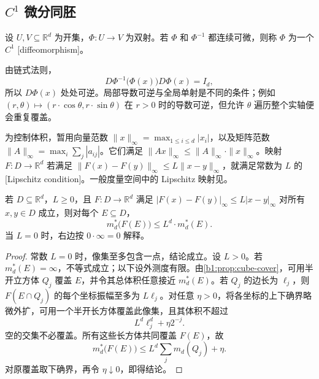 \subsection{\texorpdfstring{\(C^1\)}{C1} 微分同胚}
\label{b1:subsec:070502}

\begin{definition}\label{b1:def:c1-diffeomorphism}
设 \(U,V\subseteq\mathbb R^d\) 为开集，\(\Phi:U\rightarrow V\) 为双射。若 \(\Phi\) 和 \(\Phi^{-1}\) 都连续可微，则称 \(\Phi\) 为一个 \(C^1\) [diffeomorphism]。
\end{definition}

由链式法则，
\[
D\Phi^{-1}\bigl(\Phi(x)\bigr)D\Phi(x)=I_d,
\]
所以 \(D\Phi(x)\) 处处可逆。局部导数可逆与全局单射是不同的条件；例如 \((r,\theta)\mapsto(r\cdot \cos\theta,r\cdot \sin\theta)\) 在 \(r>0\) 时的导数可逆，但允许 \(\theta\) 遍历整个实轴便会重复覆盖。

\ProseParagraphBreak

为控制体积，暂用向量范数
\(\|x\|_\infty=\max_{1\leq i\leq d}|x_i|\)，以及矩阵范数
\(\|A\|_\infty=\max_i\sum_j|a_{ij}|\)。它们满足
\(\|Ax\|_\infty\leq\|A\|_\infty\cdot\|x\|_\infty\)。映射 \(F:D\rightarrow\mathbb R^d\) 若满足
\(\|F(x)-F(y)\|_\infty\leq L\|x-y\|_\infty\)，就满足常数为 \(L\) 的[Lipschitz condition]。一般度量空间中的 Lipschitz 映射见。

\begin{lemma}\label{b1:lem:cube-lipschitz-distortion}
若 \(D\subseteq\mathbb R^d\)，\(L\ge0\)，且 \(F:D\rightarrow\mathbb R^d\) 满足 \(|F(x)-F(y)|_\infty\le L|x-y|_\infty\) 对所有 \(x,y\in D\) 成立，则对每个 \(E\subseteq D\)，
\[
m_d^*\bigl(F(E)\bigr)\leq L^d \cdot m_d^*(E).
\]
当 \(L=0\) 时，右边按 \(0\cdot\infty=0\) 解释。
\end{lemma}
\begin{proof}
常数 \(L=0\) 时，像集至多包含一点，结论成立。设 \(L>0\)。若 \(m_d^*(E)=\infty\)，不等式成立；以下设外测度有限。由\cref{b1:prop:cube-cover}，可用半开立方体 \(Q_j\) 覆盖 \(E\)，并令其总体积任意接近 \(m_d^*(E)\)。若 \(Q_j\) 的边长为 \(\ell_j\)，则 \(F(E\cap Q_j)\) 的每个坐标振幅至多为 \(L\ell_j\)。对任意 \(\eta>0\)，将各坐标的上下确界略微外扩，可用一个半开长方体覆盖此像集，且其体积不超过
\[
L^d\ell_j^d+\eta2^{-j}.
\]
空的交集不必覆盖。所有这些长方体共同覆盖 \(F(E)\)，故
\[
m_d^*\bigl(F(E)\bigr)\leq L^d\sum_jm_d(Q_j)+\eta.
\]
对原覆盖取下确界，再令 \(\eta\downarrow0\)，即得结论。
\end{proof}

